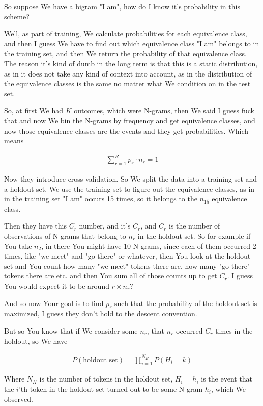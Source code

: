 \documentclass{article}
\begin{document}
			So suppose We have a bigram "I am", how do I know it's probability in this scheme?
			
			Well, as part of training, We calculate probabilities for each equivalence class, and then I guess We have to find out which equivalence class "I am" belongs to in the training set, and then We return the probability of that equivalence class. The reason it's kind of dumb in the long term is that this is a static distribution, as in it does not take any kind of context into account, as in the distribution of the equivalence classes is the same no matter what We condition on in the test set.
			
			So, at first We had $K$ outcomes, which were N-grams, then We said I guess fuck that and now We bin the N-grams by frequency and get equivalence classes, and now those equivalence classes are the events and they get probabilities. Which means
			
			\begin{align}
				\sum^R_{r=1} p_r\cdot n_r = 1
			\end{align}
			
			Now they introduce cross-validation. So We split the data into a training set and a holdout set. We use the training set to figure out the equivalence classes, as in in the training set "I am" occurs 15 times, so it belongs to the $n_15$ equivalence class.
			
			Then they have this $C_r$ number, and it's $C_r$, and $C_r$ is the number of observations of N-grams that belong to $n_r$ in the holdout set. So for example if You take $n_2$, in there You might have 10 N-grams, since each of them occurred 2 times, like "we meet" and "go there" or whatever, then You look at the holdout set and You count how many "we meet" tokens there are, how many "go there" tokens there are etc. and then You sum all of those counts up to get $C_r$. I guess You would expect it to be around $r\times n_r$?
			
			And so now Your goal is to find $p_r$ such that the probability of the holdout set is maximized, I guess they don't hold to the descent convention.
			
			But so You know that if We consider some $n_r$, that $n_r$ occurred $C_r$ times in the holdout, so We have
			
			\begin{align}
				P(\text{holdout set}) = \prod^{N_H}_{i=1} P(H_i = k)
			\end{align}
			
			Where $N_H$ is the number of tokens in the holdout set, $H_i=h_i$ is the event that the $i$'th token in the holdout set turned out to be some N-gram $h_i$, which We observed.
			
\end{document}
